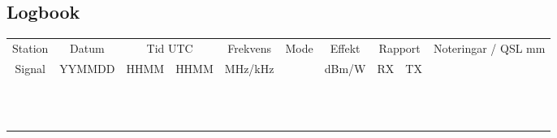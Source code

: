 \begin{landscape}
\section{Logbook}
\begin{longtable}{|c|c|c|c|c|c|c|c|c|c|}
	\hline
	Station  & Datum  & \multicolumn{2}{|c|}{Tid UTC} & Frekvens & Mode & Effekt & \multicolumn{2}{|c|}{Rapport} & Noteringar / QSL mm \\
	 Signal  & YYMMDD & HHMM &          HHMM          & MHz/kHz  &      & dBm/W  & RX &            TX            &  \\ \hline
	\endhead &        &      &                        &          &      &        &    &                          &  \\ \hline
	         &        &      &                        &          &      &        &    &                          &  \\ \hline
	         &        &      &                        &          &      &        &    &                          &  \\ \hline
	         &        &      &                        &          &      &        &    &                          &  \\ \hline
	         &        &      &                        &          &      &        &    &                          &  \\ \hline
	         &        &      &                        &          &      &        &    &                          &  \\ \hline
	         &        &      &                        &          &      &        &    &                          &  \\ \hline
	         &        &      &                        &          &      &        &    &                          &  \\ \hline
	         &        &      &                        &          &      &        &    &                          &  \\ \hline
	         &        &      &                        &          &      &        &    &                          &  \\ \hline
	         &        &      &                        &          &      &        &    &                          &  \\ \hline
	         &        &      &                        &          &      &        &    &                          &  \\ \hline

\end{longtable}
\end{landscape}
